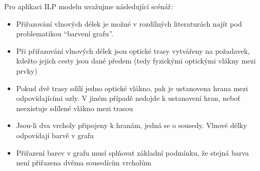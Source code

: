 Pro aplikaci ILP modelu uvažujme následující scénář:
\begin{itemize}
    \item Přiřazování vlnových délek je možné v rozdílných literaturách najít pod problematikou \enquote{barvení grafu}.
    \item Při přiřazování vlnových délek jsou optické trasy vytvářeny na požadavek, kdežto jejich cesty jsou dané předem (tedy fyzickými optickými vlákny mezi prvky)
    \item Pokud dvě trasy sdílí jedno optické vlákno, pak je ustanovena hrana mezi odpovídajícími uzly. V jiném případě nedojde k ustanovení hran, neboť neexistuje sdílené vlákno mezi trasou
    \item Jsou-li dva vrcholy připojeny k hranám, jedná se o sousedy. Vlnové délky odpovídají barvě v grafu
    \item Přiřazení barev v grafu musí splňovat základní podmínku, že stejná barva není přiřazena dvěma sousedícím vrcholům
\end{itemize}
